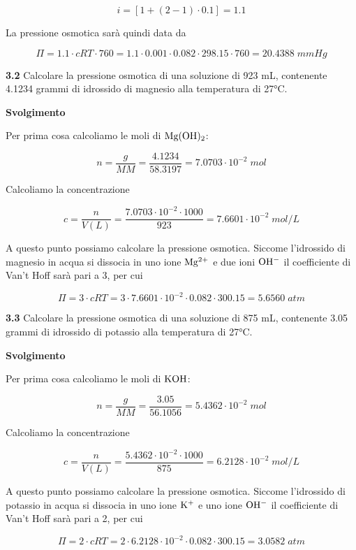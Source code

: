 $$i=[1 + (2-1) \cdot 0.1]=1.1$$

La pressione osmotica sarà quindi data da

$$\Pi=1.1 \cdot cRT \cdot 760
=1.1 \cdot 0.001 \cdot 0.082 \cdot 298.15 \cdot 760=20.4388\;mmHg$$

\vspace{0.2cm}\textbf{3.2} Calcolare la pressione osmotica di una soluzione di 923 mL, contenente 4.1234 grammi di idrossido di magnesio alla temperatura di 27°C. 

\vspace{0.2cm}\large\textbf{Svolgimento}\normalsize

\vspace{0.2cm}Per prima cosa calcoliamo le moli di $\rm Mg(OH)_2$:

$$n=\frac{g}{MM}=\frac{4.1234}{58.3197}=7.0703 \cdot 10^{-2}\;mol$$

Calcoliamo la concentrazione

$$c=\frac{n}{V(L)}=\frac{7.0703 \cdot 10^{-2} \cdot 1000}{923}=7.6601 \cdot 10^{-2}\;mol/L$$

A questo punto possiamo calcolare la pressione osmotica. Siccome l'idrossido di magnesio in acqua si dissocia in uno ione $\rm Mg^{2+}$ e due ioni $\rm OH^-$ il coefficiente di Van't Hoff sarà pari a 3, per cui

$$\Pi=3 \cdot cRT
=3 \cdot 7.6601 \cdot 10^{-2} \cdot 0.082 \cdot 300.15
=5.6560\;atm$$

\vspace{0.2cm}\textbf{3.3} Calcolare la pressione osmotica di una soluzione di 875 mL, contenente 3.05 grammi di idrossido
di potassio alla temperatura di 27°C.

\vspace{0.2cm}\large\textbf{Svolgimento}\normalsize

\vspace{0.2cm}Per prima cosa calcoliamo le moli di $\rm KOH$:

$$n=\frac{g}{MM}=\frac{3.05}{56.1056}=5.4362 \cdot 10^{-2}\;mol$$

Calcoliamo la concentrazione

$$c=\frac{n}{V(L)}=\frac{5.4362 \cdot 10^{-2} \cdot 1000}{875}=6.2128 \cdot 10^{-2}\;mol/L$$

A questo punto possiamo calcolare la pressione osmotica. Siccome l'idrossido di potassio in acqua si dissocia in uno ione $\rm K^{+}$ e uno ione $\rm OH^-$ il coefficiente di Van't Hoff sarà pari a 2, per cui

$$\Pi=2 \cdot cRT
=2 \cdot 6.2128 \cdot 10^{-2} \cdot 0.082 \cdot 300.15
=3.0582\;atm$$

